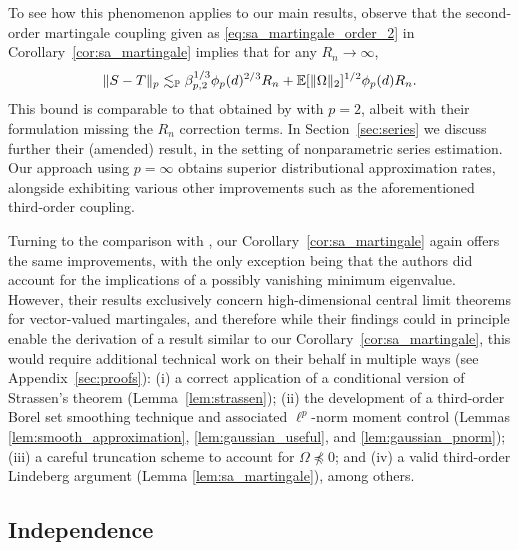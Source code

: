 To see how this phenomenon applies to our main results, observe that the
second-order martingale coupling given as \eqref{eq:sa_martingale_order_2} in
Corollary~\ref{cor:sa_martingale} implies that for any $R_n \to \infty$,
%
\begin{align*}
  \|S - T\|_p
  \lesssim_{\mathbb{P}}
  \beta_{p,2}^{1/3}
  \phi_p(d)^{2/3} R_n
  + \mathbb{E}[\|\Omega\|_2]^{1/2}
  \phi_p(d) R_n.
\end{align*}
%
This bound is comparable to that obtained by \citet[Theorem~1]{li2020uniform}
with $p=2$, albeit with their formulation missing the $R_n$ correction terms.
In Section~\ref{sec:series} we discuss further their (amended) result, in the
setting of nonparametric series estimation. Our approach using
$p = \infty$ obtains superior distributional approximation rates, alongside
exhibiting various other improvements such as the aforementioned third-order
coupling.

Turning to the comparison with \citet{belloni2018high}, our
Corollary~\ref{cor:sa_martingale} again offers the same improvements, with the
only exception being that the authors did account for the implications of a
possibly vanishing minimum eigenvalue. However, their results exclusively
concern high-dimensional central limit theorems for vector-valued martingales,
and therefore while their findings
could in principle enable the derivation of a result similar to our
Corollary~\ref{cor:sa_martingale}, this would require additional technical work
on their behalf in multiple ways
(see
Appendix~\ref{sec:proofs}):
(i) a correct application of a conditional
version of Strassen's theorem
(Lemma~\ref{lem:strassen});
(ii) the development of a third-order Borel set smoothing technique and
associated $\ell^p$-norm moment control
(Lemmas \ref{lem:smooth_approximation},
\ref{lem:gaussian_useful}, and \ref{lem:gaussian_pnorm});
(iii) a careful truncation scheme to account for
$\Omega\npreceq0$; and (iv) a valid third-order Lindeberg argument
(Lemma \ref{lem:sa_martingale}),
among others.

\subsection{Independence}

